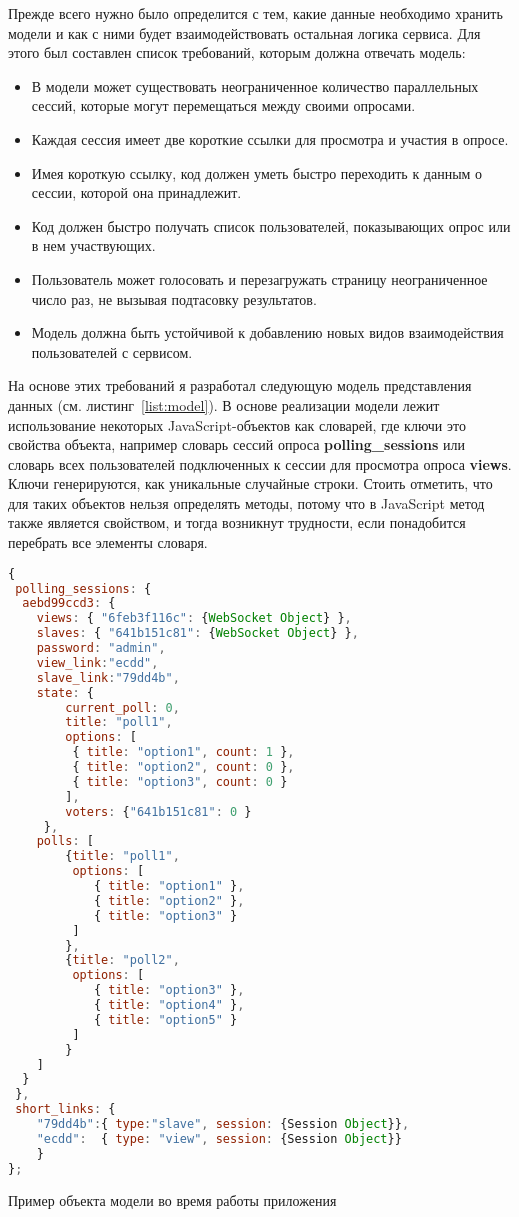 Прежде всего нужно было определится с тем, какие данные необходимо хранить модели и как с ними будет взаимодействовать остальная логика сервиса. Для этого был составлен список требований, которым должна отвечать модель:
 
\begin{itemize}
 \item В модели может существовать неограниченное количество параллельных сессий, которые могут перемещаться между своими опросами.
 \item Каждая сессия имеет две короткие ссылки для просмотра и участия в опросе. 
 \item Имея короткую ссылку, код должен уметь быстро переходить к данным о сессии, которой она принадлежит.
 \item Код должен быстро получать список пользователей, показывающих опрос или в нем участвующих.
 \item Пользователь может голосовать и перезагружать страницу неограниченное число раз, не вызывая подтасовку результатов.
 \item Модель должна быть устойчивой к добавлению новых видов взаимодействия пользователей с сервисом.
\end{itemize}
 
На основе этих требований я разработал следующую модель представления данных (см. листинг~\ref{list:model}). В основе реализации модели лежит использование некоторых JavaScript-объектов как словарей, где ключи это свойства объекта, например словарь сессий опроса \textbf{polling\_sessions} или словарь всех пользователей подключенных к сессии для просмотра опроса \textbf{views}. Ключи генерируются, как уникальные случайные строки. Стоить отметить, что для таких объектов нельзя определять методы, потому что в JavaScript метод также является свойством, и тогда возникнут трудности, если понадобится перебрать все элементы словаря. 
 
\begin{ListingEnv}
\begin{lstlisting}[language=JavaScript]
{
 polling_sessions: {
  aebd99ccd3: {
	views: { "6feb3f116c": {WebSocket Object} },
	slaves: { "641b151c81": {WebSocket Object} },
	password: "admin",
	view_link:"ecdd",
	slave_link:"79dd4b",
	state: {
		current_poll: 0,
		title: "poll1",
		options: [
		 { title: "option1", count: 1 },
		 { title: "option2", count: 0 },
		 { title: "option3", count: 0 }
		],
		voters: {"641b151c81": 0 }
	 },
	polls: [
		{title: "poll1",
		 options: [
		 	{ title: "option1" },
			{ title: "option2" },
			{ title: "option3" }
		 ]
		},
		{title: "poll2",
		 options: [
			{ title: "option3" },
			{ title: "option4" },
			{ title: "option5" }
		 ]
		}
	]
  }
 },
 short_links: {
	"79dd4b":{ type:"slave", session: {Session Object}},
	"ecdd":	 { type: "view", session: {Session Object}}
	}
};
\end{lstlisting}
\caption{Пример объекта модели во время работы приложения}
\label{list:model}
\end{ListingEnv}
 
